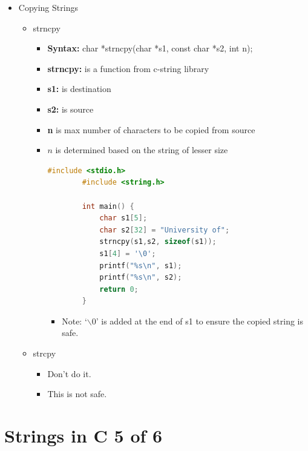 \documentclass[12pt]{article}
\begin{document}
\begin{itemize}
    \item Copying Strings
    \begin{itemize}
        \item strncpy
        \begin{itemize}
            \item \textbf{Syntax:} char *strncpy(char *s1, const char *s2, int n);
            \item \textbf{strncpy:} is a function from c-string library
            \item \textbf{s1:} is destination
            \item \textbf{s2:} is source
            \item \textbf{n} is max number of characters to be copied from source
            \item $n$ is determined based on the string of lesser size

        \begin{lstlisting}[language=c,caption={strings\_example\_4.c}]
        #include <stdio.h>
        #include <string.h>

        int main() {
            char s1[5];
            char s2[32] = "University of";
            strncpy(s1,s2, sizeof(s1));
            s1[4] = '\0';
            printf("%s\n", s1);
            printf("%s\n", s2);
            return 0;
        }
        \end{lstlisting}

            \begin{itemize}
                \item Note: `$\backslash0$' is added at the end of s1 to ensure the
                copied string is safe.
            \end{itemize}
        \end{itemize}
        \item strcpy
        \begin{itemize}
            \item Don't do it.
            \item This is not safe.
        \end{itemize}
    \end{itemize}
\end{itemize}

\bigskip

\section*{Strings in C 5 of 6}
\end{document}
